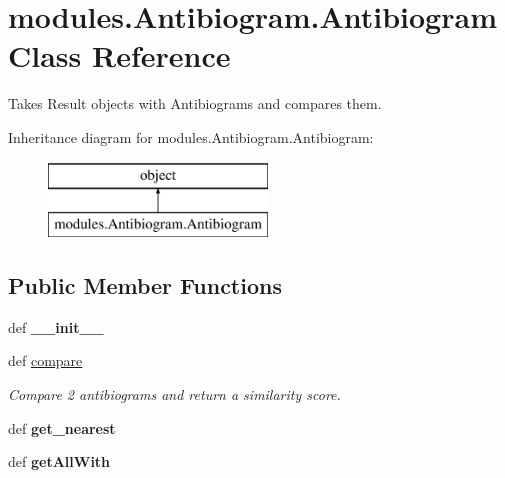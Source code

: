 \hypertarget{classmodules_1_1_antibiogram_1_1_antibiogram}{\section{modules.\-Antibiogram.\-Antibiogram Class Reference}
\label{classmodules_1_1_antibiogram_1_1_antibiogram}
}


Takes Result objects with Antibiograms and compares them.  


Inheritance diagram for modules.\-Antibiogram.\-Antibiogram\-:\begin{figure}[H]
\begin{center}
\leavevmode
\includegraphics[height=2.000000cm]{classmodules_1_1_antibiogram_1_1_antibiogram}
\end{center}
\end{figure}
\subsection*{Public Member Functions}
\begin{DoxyCompactItemize}
\item 
\hypertarget{classmodules_1_1_antibiogram_1_1_antibiogram_a93bcdb67615825ff4ded9116df79bd68}{def {\bfseries \-\_\-\-\_\-init\-\_\-\-\_\-}}\label{classmodules_1_1_antibiogram_1_1_antibiogram_a93bcdb67615825ff4ded9116df79bd68}

\item 
def \hyperlink{classmodules_1_1_antibiogram_1_1_antibiogram_acbbd4414348d53c039eddfc40db165f8}{compare}
\begin{DoxyCompactList}\small\item\em Compare 2 antibiograms and return a similarity score. \end{DoxyCompactList}\item 
\hypertarget{classmodules_1_1_antibiogram_1_1_antibiogram_a315d6ef4e6bbfabf12f39552c5f72616}{def {\bfseries get\-\_\-nearest}}\label{classmodules_1_1_antibiogram_1_1_antibiogram_a315d6ef4e6bbfabf12f39552c5f72616}

\item 
\hypertarget{classmodules_1_1_antibiogram_1_1_antibiogram_a19e90e9a86c485f1621c4ad7e3ec5c23}{def {\bfseries get\-All\-With}}\label{classmodules_1_1_antibiogram_1_1_antibiogram_a19e90e9a86c485f1621c4ad7e3ec5c23}

\end{DoxyCompactItemize}
